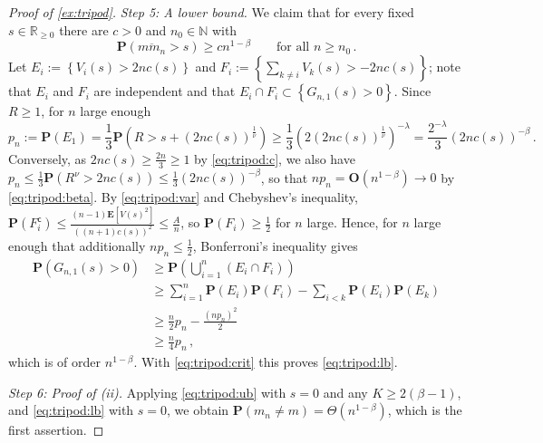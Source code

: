 \documentclass{article}
\newcommand*{\mo}[1]{\mathbf{#1}}
\newcommand{\N}{\mathbb{N}}
\newcommand{\R}{\mathbb{R}}
\newcommand{\Rp}{\R_{\geq0}}
\newcommand{\lcb}{\left\lbrace} %
\newcommand{\rcb}{\right\rbrace} %
\newcommand{\cb}[1]{\lcb #1 \rcb} %
\newcommand{\lb}{\left(} %
\newcommand{\rb}{\right)} %
\newcommand{\br}[1]{\lb #1 \rb} %
\newcommand{\brOf}[1]{\!\br{#1}} %
\renewcommand{\Pr}{\mathbf{P}} %
\newcommand{\PrOf}[1]{\Pr\brOf{#1}}
\newcommand{\E}{\mathbf{E}} %
\newcommand{\Eof}[1]{\E[#1]}
\newcommand{\compl}{^\mathsf{c}}%
\newcommand{\eqcm}{\,,} %
\newcommand{\eqfs}{\,.}
\newcommand{\ol}[2]{\overline{#1#2}}
\begin{document}
\begin{proof}[Proof of \cref{ex:tripod}]
    \emph{Step 5: A lower bound.}
    We claim that for every fixed $s\in\Rp$ there are $c>0$ and $n_0\in\N$ with
    \begin{equation}\label{eq:tripod:lb}
        \PrOf{\ol m{m_n}>s} \geq c n^{1-\beta}
        \qquad\text{for all } n\geq n_0
        \eqfs
    \end{equation}
    Let $E_i := \cb{V_i(s) > 2nc(s)}$ and $F_i := \cb{\sum_{k\neq i}V_k(s) > -2nc(s)}$; note that $E_i$ and $F_i$ are independent and that $E_i\cap F_i\subset\cb{G_{n,1}(s)>0}$. Since $R\geq1$, for $n$ large enough
    \begin{equation}
        p_n
        :=
        \PrOf{E_1}
        =
        \frac13\PrOf{R > s+\br{2nc(s)}^{\frac1\nu}}
        \geq
        \frac13\brOf{2\br{2nc(s)}^{\frac1\nu}}^{-\lambda}
        =
        \frac{2^{-\lambda}}{3}\br{2nc(s)}^{-\beta}
        \eqfs
    \end{equation}
    Conversely, as $2nc(s)\geq\frac{2n}3\geq1$ by \eqref{eq:tripod:c}, we also have $p_n\leq\frac13\PrOf{R^\nu > 2nc(s)}\leq\frac13\br{2nc(s)}^{-\beta}$, so that $np_n = \mo O\br{n^{1-\beta}}\to0$ by \eqref{eq:tripod:beta}.
    By \eqref{eq:tripod:var} and Chebyshev's inequality,
    $\PrOf{F_i\compl} \leq \frac{(n-1)\Eof{V(s)^2}}{\br{(n+1)c(s)}^2}\leq \frac An$,
    so $\PrOf{F_i}\geq\frac12$ for $n$ large. Hence, for $n$ large enough that additionally $np_n\leq\frac12$, Bonferroni's inequality gives
    \begin{align}
        \PrOf{G_{n,1}(s)>0}
        &\geq
        \PrOf{\bigcup_{i=1}^n \br{E_i\cap F_i}}
        \\&\geq
        \sum_{i=1}^n\PrOf{E_i}\PrOf{F_i} - \sum_{i<k}\PrOf{E_i}\PrOf{E_k}
        \\&\geq
        \frac n2 p_n - \frac{\br{np_n}^2}{2}
        \\&\geq
        \frac n4 p_n
        \eqcm
    \end{align}
    which is of order $n^{1-\beta}$. With \eqref{eq:tripod:crit} this proves \eqref{eq:tripod:lb}.
    
    \emph{Step 6: Proof of (ii).}
    Applying \eqref{eq:tripod:ub} with $s=0$ and any $K\geq2(\beta-1)$, and \eqref{eq:tripod:lb} with $s=0$, we obtain
    $\PrOf{m_n\neq m} = \Theta\br{n^{1-\beta}}$, which is the first assertion.
    

\end{proof}
\end{document}
